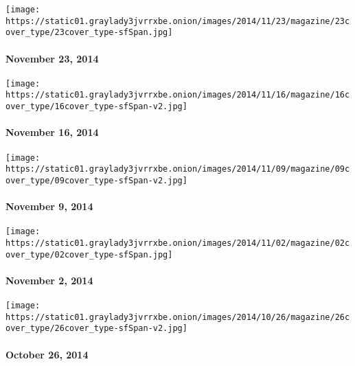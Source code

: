 \href{http://www.nytimes3xbfgragh.onion/indexes/2014/11/23/magazine/index.html}{}

\texttt{[image: https://static01.graylady3jvrrxbe.onion/images/2014/11/23/magazine/23cover\_type/23cover\_type-sfSpan.jpg]}

\hypertarget{november-23-2014}{%
\paragraph{November 23, 2014}\label{november-23-2014}}

\href{http://www.nytimes3xbfgragh.onion/indexes/2014/11/16/magazine/index.html}{}

\texttt{[image: https://static01.graylady3jvrrxbe.onion/images/2014/11/16/magazine/16cover\_type/16cover\_type-sfSpan-v2.jpg]}

\hypertarget{november-16-2014}{%
\paragraph{November 16, 2014}\label{november-16-2014}}

\href{http://www.nytimes3xbfgragh.onion/indexes/2014/11/09/magazine/index.html}{}

\texttt{[image: https://static01.graylady3jvrrxbe.onion/images/2014/11/09/magazine/09cover\_type/09cover\_type-sfSpan-v2.jpg]}

\hypertarget{november-9-2014}{%
\paragraph{November 9, 2014}\label{november-9-2014}}

\href{http://www.nytimes3xbfgragh.onion/indexes/2014/11/02/magazine/index.html}{}

\texttt{[image: https://static01.graylady3jvrrxbe.onion/images/2014/11/02/magazine/02cover\_type/02cover\_type-sfSpan.jpg]}

\hypertarget{november-2-2014}{%
\paragraph{November 2, 2014}\label{november-2-2014}}

\href{http://www.nytimes3xbfgragh.onion/indexes/2014/10/26/magazine/index.html}{}

\texttt{[image: https://static01.graylady3jvrrxbe.onion/images/2014/10/26/magazine/26cover\_type/26cover\_type-sfSpan-v2.jpg]}

\hypertarget{october-26-2014}{%
\paragraph{October 26, 2014}\label{october-26-2014}}

